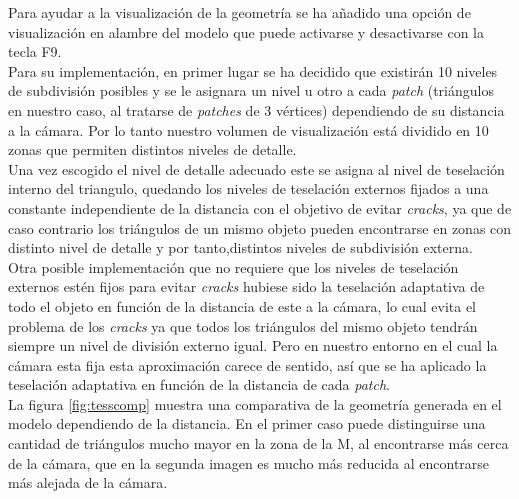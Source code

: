 \documentclass[10pt,oneside,a4paper]{article}
\begin{document}
Para ayudar a la visualización de la geometría se ha añadido una opción de visualización en alambre del modelo que puede activarse y desactivarse con la tecla F9.\\

Para su implementación, en primer lugar se ha decidido que existirán 10 niveles de subdivisión posibles y se le asignara un nivel u otro a cada \textit{patch} (triángulos en nuestro caso, al tratarse de \textit{patches} de 3 vértices) dependiendo de su distancia a la cámara. Por lo tanto nuestro volumen de visualización está dividido en 10 zonas que permiten distintos niveles de detalle.\\

Una vez escogido el nivel de detalle adecuado este se asigna al nivel de teselación interno del triangulo, quedando los niveles de teselación externos fijados a una constante independiente de la distancia con el objetivo de evitar \textit{cracks}, ya que de caso contrario los triángulos de un mismo objeto pueden encontrarse en zonas con distinto nivel de detalle y por tanto,distintos niveles de subdivisión externa.\\

Otra posible implementación que no requiere que los niveles de teselación externos estén fijos para evitar \textit{cracks} hubiese sido la teselación adaptativa de todo el objeto en función de la distancia de este a la cámara, lo cual evita el problema de los \textit{cracks} ya que todos los triángulos del mismo objeto tendrán siempre un nivel de división externo igual. Pero en nuestro entorno en el cual la cámara esta fija esta aproximación carece de sentido, así que se ha aplicado la teselación adaptativa en función de la distancia de cada \textit{patch}.\\

La figura \ref{fig:tesscomp} muestra una comparativa de la geometría generada en el modelo dependiendo de la distancia. En el primer caso puede distinguirse una cantidad de triángulos mucho mayor en la zona de la M, al encontrarse más cerca de la cámara, que en la segunda imagen es mucho más reducida al encontrarse más alejada de la cámara.
\end{document}
